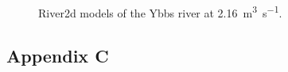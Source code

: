 \begin{figure}[h!]
\begin{tabular}{ l  c }
	\end{tabular}
	\label{fig:0216}
	
	\caption{River2d models of the Ybbs river at \SI[per-mode=symbol]{2.16}{\cubic\meter\per\second}.}   %
	
\end{figure}


\newpage                                                                %


\subsection*{Appendix C}\label{appendixC}                        %

\renewcommand\thefigure{A.\arabic{figure}}                          %
\setcounter{figure}{0}                                              %

